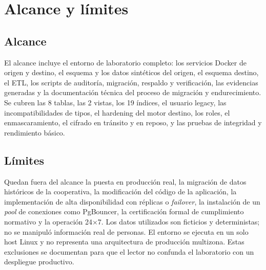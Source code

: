 \section{Alcance y límites}

\subsection{Alcance}

El alcance incluye el entorno de laboratorio completo: los servicios Docker
de origen y destino, el esquema y los datos sintéticos del origen, el esquema
destino, el ETL, los scripts de auditoría, migración, respaldo y verificación,
las evidencias generadas y la documentación técnica del proceso de migración
y endurecimiento. Se
cubren las 8 tablas, las 2 vistas, los 19 índices, el usuario legacy, las
incompatibilidades de tipos, el hardening del motor destino, los roles, el
enmascaramiento, el cifrado en tránsito y en reposo, y las pruebas de
integridad y rendimiento básico.

\subsection{Límites}

Quedan fuera del alcance la puesta en producción real, la migración de datos
históricos de la cooperativa, la modificación del código de la aplicación, la
implementación de alta disponibilidad con réplicas o \emph{failover}, la
instalación de un \emph{pool} de conexiones como PgBouncer, la certificación
formal de cumplimiento normativo y la operación 24×7. Los datos utilizados
son ficticios y deterministas; no se manipuló información real de personas.
El entorno se ejecuta en un solo host Linux y no representa una arquitectura
de producción multizona. Estas exclusiones se documentan para que el lector
no confunda el laboratorio con un despliegue productivo.
